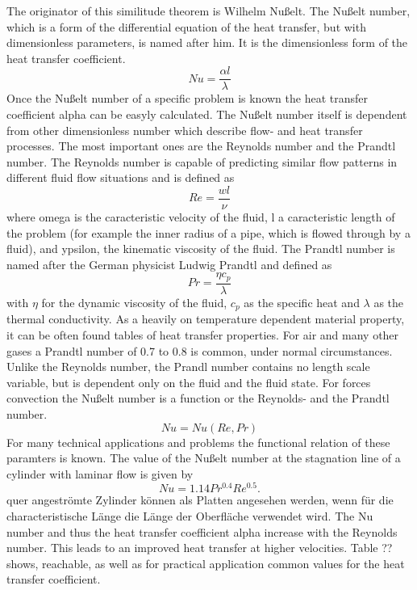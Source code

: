 The originator of this similitude theorem is Wilhelm Nußelt. The Nußelt number, which is a form of the differential equation of the heat transfer, but with dimensionless parameters, is named after him. It is the dimensionless form of the heat transfer coefficient.
\begin{equation}
Nu = \frac{\alpha l}{\lambda}
\end{equation}
Once the Nußelt number of a specific problem is known the heat transfer coefficient alpha can be easyly calculated. The Nußelt number itself is dependent from other dimensionless number which describe flow- and heat transfer processes.
The most important ones are the Reynolds number and the Prandtl number. The Reynolds number is capable of predicting similar flow patterns in different fluid flow situations and is defined as 
\begin{equation}
Re = \frac{w l}{\nu}
\end{equation}
where omega is the caracteristic velocity of the fluid, l a caracteristic length of the problem (for example the inner radius of a pipe, which is flowed through by a fluid), and ypsilon, the kinematic viscosity of the fluid.
The Prandtl number is named after the German physicist Ludwig Prandtl and defined as
\begin{equation}
Pr = \frac{\eta c_p}{\lambda}
\end{equation}
with $\eta$ for the dynamic viscosity of the fluid, $c_p$ as the specific heat and $\lambda$ as the thermal conductivity. As a heavily on temperature dependent material property, it can be often found tables of heat transfer properties. For air and many other gases a Prandtl number of 0.7 to 0.8 is common, under normal circumstances. Unlike the Reynolds number, the Prandl number contains no length scale variable, but is dependent only on the fluid and the fluid state.
For forces convection the Nußelt number is a function or the Reynolds- and the Prandtl number.
\begin{equation}
Nu = Nu( Re, Pr )
\end{equation}
For many technical applications and problems the functional relation of these paramters is known. The value of the Nußelt number at the stagnation line of a cylinder with laminar flow is given by
\begin{equation}
Nu = 1.14Pr^{0.4} Re^{0.5}. 
\end{equation}
quer angeströmte Zylinder können als Platten angesehen werden, wenn für die characteristische Länge die Länge der Oberfläche verwendet wird. The Nu number and thus the heat transfer coefficient alpha increase with the Reynolds number. This leads to an improved heat transfer at higher velocities. 
Table ?? shows, reachable, as well as for practical application common values for the heat transfer coefficient.





